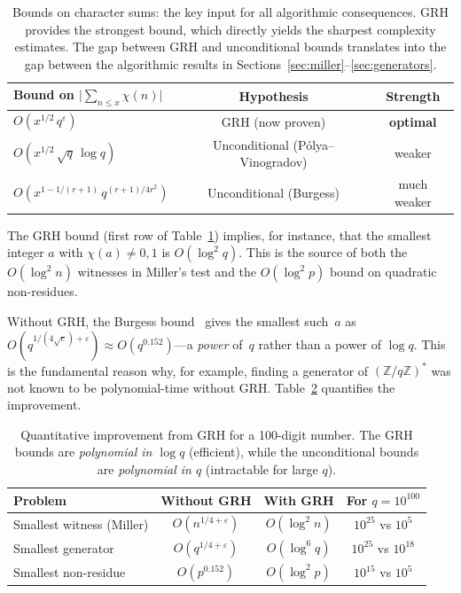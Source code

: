 \documentclass[11pt]{article}
\theoremstyle{plain}
\theoremstyle{definition}
\theoremstyle{remark}
\begin{document}
\begin{table}[ht]
\centering
\begin{tabular}{lcc}
\toprule
\textbf{Bound on $\bigl|\sum_{n \leq x} \chi(n)\bigr|$} & \textbf{Hypothesis} & \textbf{Strength} \\
\midrule
$O(x^{1/2}\, q^{\varepsilon})$ & GRH (now proven) & \textbf{optimal} \\
$O(x^{1/2}\, \sqrt{q}\, \log q)$ & Unconditional (P\'olya--Vinogradov) & weaker \\
$O(x^{1-1/(r+1)}\, q^{(r+1)/4r^2})$ & Unconditional (Burgess) & much weaker \\
\bottomrule
\end{tabular}
\caption{Bounds on character sums: the key input for all algorithmic
consequences. GRH provides the strongest bound, which directly yields
the sharpest complexity estimates. The gap between GRH and unconditional
bounds translates into the gap between the algorithmic results in
Sections~\ref{sec:miller}--\ref{sec:generators}.}
\label{tab:charsums}
\end{table}

The GRH bound (first row of Table~\ref{tab:charsums}) implies, for instance,
that the smallest integer $a$ with $\chi(a) \neq 0,1$ is $O(\log^2 q)$.
This is the source of both the $O(\log^2 n)$ witnesses in Miller's test
and the $O(\log^2 p)$ bound on quadratic non-residues.

Without GRH, the Burgess bound~\cite{Burgess1962} gives the smallest
such~$a$ as $O(q^{1/(4\sqrt{e})+\varepsilon}) \approx O(q^{0.152})$---a
\emph{power} of~$q$ rather than a power of $\log q$. This is the
fundamental reason why, for example, finding a generator of
$(\mathbb{Z}/q\mathbb{Z})^*$ was not known to be polynomial-time
without GRH. Table~\ref{tab:improvement} quantifies the improvement.

\begin{table}[ht]
\centering
\begin{tabular}{lccc}
\toprule
\textbf{Problem} & \textbf{Without GRH} & \textbf{With GRH} & \textbf{For $q = 10^{100}$} \\
\midrule
Smallest witness (Miller) & $O(n^{1/4+\varepsilon})$ & $O(\log^2 n)$ & $10^{25}$ vs $10^5$ \\
Smallest generator & $O(q^{1/4+\varepsilon})$ & $O(\log^6 q)$ & $10^{25}$ vs $10^{18}$ \\
Smallest non-residue & $O(p^{0.152})$ & $O(\log^2 p)$ & $10^{15}$ vs $10^5$ \\
\bottomrule
\end{tabular}
\caption{Quantitative improvement from GRH for a 100-digit number.
The GRH bounds are \emph{polynomial in $\log q$} (efficient),
while the unconditional bounds are \emph{polynomial in $q$}
(intractable for large $q$).}
\label{tab:improvement}
\end{table}
\end{document}
